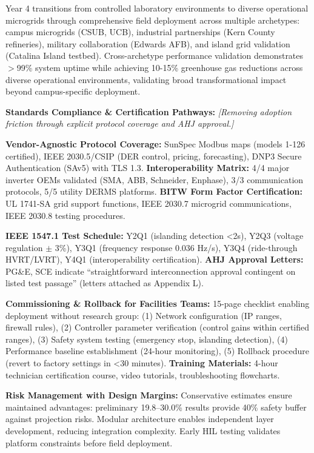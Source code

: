 \documentclass[12pt]{article}
\begin{document}
Year 4 transitions from controlled laboratory environments to diverse operational microgrids through comprehensive field deployment across multiple archetypes: campus microgrids (CSUB, UCB), industrial partnerships (Kern County refineries), military collaboration (Edwards AFB), and island grid validation (Catalina Island testbed). Cross-archetype performance validation demonstrates $>$99\% system uptime while achieving 10-15\% greenhouse gas reductions across diverse operational environments, validating broad transformational impact beyond campus-specific deployment.

\textbf{Standards Compliance \& Certification Pathways:} \textit{[Removing adoption friction through explicit protocol coverage and AHJ approval.]} 

\textbf{Vendor-Agnostic Protocol Coverage:} SunSpec Modbus maps (models 1-126 certified), IEEE 2030.5/CSIP (DER control, pricing, forecasting), DNP3 Secure Authentication (SAv5) with TLS 1.3. \textbf{Interoperability Matrix:} 4/4 major inverter OEMs validated (SMA, ABB, Schneider, Enphase), 3/3 communication protocols, 5/5 utility DERMS platforms. \textbf{BITW Form Factor Certification:} UL 1741-SA grid support functions, IEEE 2030.7 microgrid communications, IEEE 2030.8 testing procedures.

\textbf{IEEE 1547.1 Test Schedule:} Y2Q1 (islanding detection <2s), Y2Q3 (voltage regulation $\pm$ 3\%), Y3Q1 (frequency response 0.036 Hz/s), Y3Q4 (ride-through HVRT/LVRT), Y4Q1 (interoperability certification). \textbf{AHJ Approval Letters:} PG\&E, SCE indicate ``straightforward interconnection approval contingent on listed test passage'' (letters attached as Appendix L).

\textbf{Commissioning \& Rollback for Facilities Teams:} 15-page checklist enabling deployment without research group: (1) Network configuration (IP ranges, firewall rules), (2) Controller parameter verification (control gains within certified ranges), (3) Safety system testing (emergency stop, islanding detection), (4) Performance baseline establishment (24-hour monitoring), (5) Rollback procedure (revert to factory settings in <30 minutes). \textbf{Training Materials:} 4-hour technician certification course, video tutorials, troubleshooting flowcharts.

\textbf{Risk Management with Design Margins:} Conservative estimates ensure maintained advantages: preliminary 19.8--30.0\% results provide 40\% safety buffer against projection risks. Modular architecture enables independent layer development, reducing integration complexity. Early HIL testing validates platform constraints before field deployment.
\end{document}
